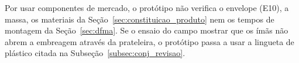 Por usar componentes de mercado, o protótipo não verifica o envelope (E10), a massa, os materiais da Seção~\ref{sec:constituicao_produto} nem os tempos de montagem da Seção~\ref{sec:dfma}. Se o ensaio do campo mostrar que os ímãs não abrem a embreagem através da prateleira, o protótipo passa a usar a lingueta de plástico citada na Subseção~\ref{subsec:conj_revisao}.
